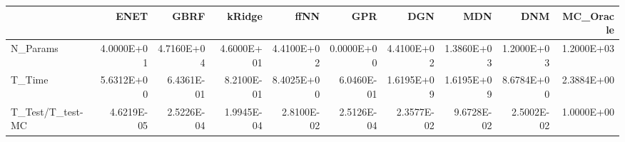 \begin{tabular}{lrrrrrrrrr}
\toprule
{} &       ENET &       GBRF &     kRidge &       ffNN &        GPR &        DGN &        MDN &        DNM &  MC\_Oracle \\
\midrule
N\_Params         & 4.0000E+01 & 4.7160E+04 & 4.6000E+01 & 4.4100E+02 & 0.0000E+00 & 4.4100E+02 & 1.3860E+03 & 1.2000E+03 & 1.2000E+03 \\
T\_Time           & 5.6312E+00 & 6.4361E-01 & 8.2100E-01 & 8.4025E+00 & 6.0460E-01 & 1.6195E+09 & 1.6195E+09 & 8.6784E+00 & 2.3884E+00 \\
T\_Test/T\_test-MC & 4.6219E-05 & 2.5226E-04 & 1.9945E-04 & 2.8100E-02 & 2.5126E-04 & 2.3577E-02 & 9.6728E-02 & 2.5002E-02 & 1.0000E+00 \\
\bottomrule
\end{tabular}
